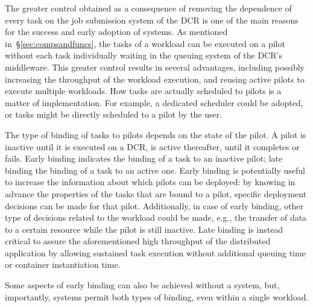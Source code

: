 \documentclass{sig-alternate}
\begin{document}


The greater control obtained as a consequence of removing the dependence of
every task on the job submission system of the DCR is one of the main reasons
for the success and early adoption of \pilot systems. As mentioned
in~\S\ref{sec:compsandfuncs}, the tasks of a workload can be executed on a pilot
without each task individually waiting in the queuing system of the DCR's
middleware. This greater control results in several advantages, including
possibly increasing the throughput of the workload execution, and reusing active
pilots to execute multiple workloads. How tasks are actually scheduled to pilots
is a matter of implementation. For example, a dedicated scheduler could be
adopted, or tasks might be directly scheduled to a pilot by the user.

The type of binding of tasks to pilots depends on the state of the pilot. A
pilot is inactive until it is executed on a DCR, is active thereafter, until it
completes or fails. Early binding indicates the binding of a task to an inactive
pilot; late binding the binding of a task to an active one. Early binding is
potentially useful to increase the information about which pilots can be
deployed: by knowing in advance the properties of the tasks that are bound to a
pilot, specific deployment decisions can be made for that pilot. Additionally,
in case of early binding, other type of decisions related to the workload could
be made, e.g., the transfer of data to a certain resource while the pilot is
still inactive. Late binding is instead critical to assure the aforementioned
high throughput of the distributed application by allowing sustained task
execution without additional queuing time or container instantiation time.

Some aspects of early binding can also be achieved without a \pilot system, but,
importantly, \pilot systems permit both types of binding, even within a single
workload.


\end{document}
